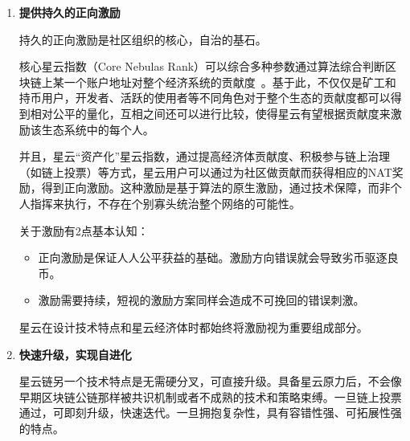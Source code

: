 \begin{enumerate}
	\item \textbf{提供持久的正向激励}
	
	持久的正向激励是社区组织的核心，自治的基石。

	核心星云指数（Core Nebulas Rank）可以综合多种参数通过算法综合判断区块链上某一个账户地址对整个经济系统的贡献度~\cite{yellowpaper}。基于此，不仅仅是矿工和持币用户，开发者、活跃的使用者等不同角色对于整个生态的贡献度都可以得到相对公平的量化，互相之间还可以进行比较，使得星云有望根据贡献度来激励该生态系统中的每个人。

	并且，星云“资产化”星云指数，通过提高经济体贡献度、积极参与链上治理（如链上投票）等方式，星云用户可以通过为社区做贡献而获得相应的NAT奖励，得到正向激励。这种激励是基于算法的原生激励，通过技术保障，而非个人指挥来执行，不存在个别寡头统治整个网络的可能性。

	关于激励有2点基本认知：

	\begin{itemize}
		\item 正向激励是保证人人公平获益的基础。激励方向错误就会导致劣币驱逐良币。
		\item 激励需要持续，短视的激励方案同样会造成不可挽回的错误刺激。
	\end{itemize}

	星云在设计技术特点和星云经济体时都始终将激励视为重要组成部分。
	
	\item \textbf{快速升级，实现自进化}
	
	星云链另一个技术特点是无需硬分叉，可直接升级。具备星云原力后，不会像早期区块链公链那样被共识机制或者不成熟的技术和策略束缚。一旦链上投票通过，可即刻升级，快速迭代。一旦拥抱复杂性，具有容错性强、可拓展性强的特点。

\end{enumerate}
